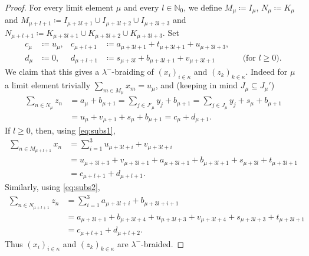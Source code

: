 \documentclass[a4paper,11pt,oneside]{amsart}
\theoremstyle{remark}
\newcommand{\bN}{\mathbb N}
\begin{document}
\begin{proof}
  For every limit element $\mu$ and every $l \in \bN_0$, we define $M_\mu\coloneqq I_\mu$, $N_\mu \coloneqq K_\mu$ and $M_{\mu + l +1} \coloneqq I_{\mu+3l+1} \cup I_{\mu + 3l+2} \cup I_{\mu + 3l+3}$ and $N_{\mu+l+1} \coloneqq K_{\mu + 3l+1} \cup K_{\mu + 3l+2} \cup K_{\mu + 3l+3}$.
  Set
  \begin{align*}
    c_\mu &\coloneqq u_\mu,& c_{\mu+l+1} &\coloneqq a_{\mu+3l+1} + t_{\mu+3l+1} + u_{\mu+3l+3}, & &  \\
    d_\mu &\coloneqq 0,& d_{\mu + l +1} &\coloneqq s_{\mu+3l} + b_{\mu +3l+1} + v_{\mu+3l+1}  & &\text{(for $l \ge 0$)}.
  \end{align*}
  We claim that this gives a $\lambda^-$-braiding of $(x_i)_{i \in \kappa}$ and $(z_k)_{k \in \kappa}$.
  Indeed for $\mu$ a limit element trivially $\sum_{m \in M_\mu} x_m = u_\mu$, and (keeping in mind $J_\mu \subseteq J_\mu'$)
  \[
    \begin{split}
      \sum_{n \in N_\mu} z_n &= a_\mu + b_{\mu+1} = \sum_{j \in J'_\mu} y_j + b_{\mu+1} = \sum_{j \in J_\mu} y_j + s_\mu + b_{\mu+1} \\
      &= u_\mu + v_{\mu+1} + s_\mu + b_{\mu + 1} = c_\mu + d_{\mu+1}.
    \end{split}
  \]
  If $l \ge 0$, then, using \cref{eq:subs1},
  \[
    \begin{split}
      \sum_{n \in M_{\mu + l + 1}} x_n &= \sum_{i=1}^3 u_{\mu+3l+i} + v_{\mu+3l+i} \\
      &= u_{\mu+3l+3} + v_{\mu+3l+1} + a_{\mu+3l+1} +b_{\mu+3l+1} + s_{\mu + 3l} + t_{\mu+3l+1}  \\
      &= c_{\mu+l+1} + d_{\mu+l+1}.
    \end{split}
  \]
  Similarly, using \cref{eq:subs2},
  \[
    \begin{split}
      \sum_{n \in N_{\mu + l + 1}} z_n &= \sum_{i=1}^3 a_{\mu+3l+i} + b_{\mu+3l+i+1} \\
      &= a_{\mu+3l+1} + b_{\mu+3l+4} + u_{\mu+3l+3} + v_{\mu+3l+4} + s_{\mu + 3l+3} + t_{\mu + 3l + 1} \\
      &= c_{\mu+l+1} + d_{\mu+l+2}.
    \end{split}
  \]
  Thus $(x_i)_{i \in \kappa}$ and $(z_k)_{k \in \kappa}$ are $\lambda^-$-braided.
\end{proof}
\end{document}
